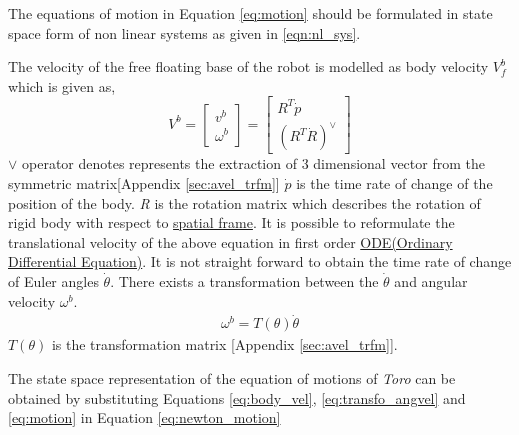 The equations of motion in Equation \ref{eq:motion} should be formulated in state space form of non linear systems as given in \ref{eqn:nl_sys}.

The velocity of the free floating base of the robot is modelled as body velocity $V_f^b$ which is given as,
\begin{equation}
\label{eq:body_vel}
V^b =
\begin{bmatrix}
v^b \\ \omega^b
\end{bmatrix}
= \begin{bmatrix}
R^T \dot{p} \\ (R^T \dot{R})^\vee
\end{bmatrix}
\end{equation}
$\vee$ operator denotes represents the extraction of 3 dimensional vector from the symmetric matrix[Appendix \ref{sec:avel_trfm}]
$\dot{p}$ is the time rate of change of the position of the body. \emph{R} is the rotation matrix which describes the rotation of rigid body with respect to \underline{spatial frame}. It is possible to reformulate the translational velocity of the above equation in first order \underline{ODE(Ordinary Differential Equation)}. It is not straight forward to obtain the time rate of change of Euler angles $\dot{\theta}$. There exists a transformation between the $\dot{\theta}$ and angular velocity $\omega^b$.
\begin{equation}
\label{eq:transfo_angvel}
\begin{split}
\omega^b = T(\theta)\dot{\theta}
\end{split}
\end{equation}
$T(\theta)$ is the transformation matrix [Appendix \ref{sec:avel_trfm}]. 

The state space representation of the equation of motions of \emph{Toro} can be obtained by substituting Equations \ref{eq:body_vel}, \ref{eq:transfo_angvel} and \ref{eq:motion} in Equation \ref{eq:newton_motion}

